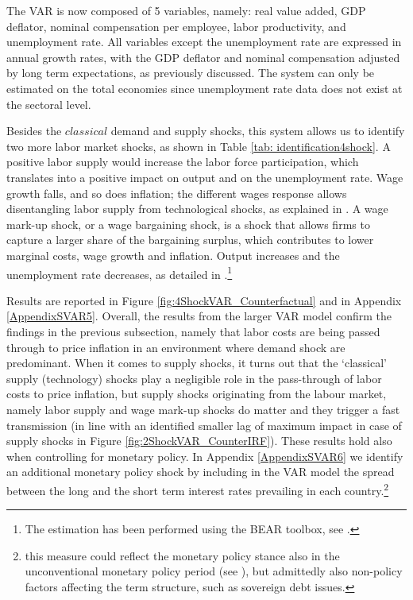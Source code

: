 \documentclass[11pt]{article}
\begin{document}
The VAR is now composed of 5 variables, namely: real value added, GDP deflator, nominal compensation per employee, labor productivity, and unemployment rate. All variables except the unemployment rate are expressed in annual growth rates, with the GDP deflator and nominal compensation adjusted by long term expectations, as previously discussed. The system can only be estimated on the total economies since unemployment rate data does not exist at the sectoral level. 

Besides the $classical$ demand and supply shocks, this system allows us to identify two more labor market shocks, as shown in Table \ref{tab: identification4shock}. A positive labor supply would increase the labor force participation, which translates into a positive impact on output and on the unemployment rate. Wage growth falls, and so does inflation; the different wages response allows disentangling labor supply from technological shocks, as explained in \cite{Peersman_Straub_09}. A wage mark-up shock, or a wage bargaining shock, is a shock that allows firms to capture a larger share of the bargaining surplus, which contributes to lower marginal costs, wage growth and inflation. Output increases and the unemployment rate decreases, as detailed in \cite{Foroni_18}.\footnote{The estimation has been performed using the BEAR toolbox, see \cite{Dieppe_2016}.} 

Results are reported in Figure \ref{fig:4ShockVAR_Counterfactual} and in Appendix \ref{AppendixSVAR5}. Overall, the results from the larger VAR model confirm the findings in the previous subsection, namely that labor costs are being passed through to price inflation in an environment where demand shock are predominant. When it comes to supply shocks, it turns out that the `classical' supply (technology) shocks play a negligible role in the pass-through of labor costs to price inflation, but supply shocks originating from the labour market, namely labor supply and wage mark-up shocks do matter and they trigger a fast transmission (in line with an identified smaller lag of maximum impact in case of supply shocks in Figure \ref{fig:2ShockVAR_CounterIRF}). These results hold also when controlling for monetary policy. In Appendix \ref{AppendixSVAR6} we identify an additional monetary policy shock by including in the VAR model the spread between the long and the short term interest rates prevailing in each country.\footnote{this measure could reflect the monetary policy stance also in the unconventional monetary policy period (see \cite{Baumeister_Benati_13}), but admittedly also non-policy factors
affecting the term structure, such as sovereign debt issues.}
\end{document}
